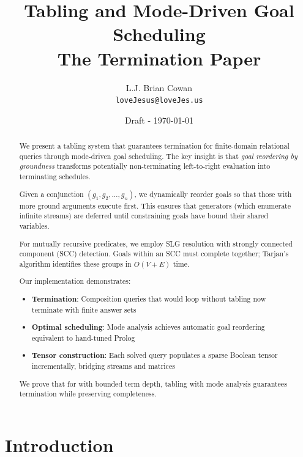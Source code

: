 \documentclass[11pt,a4paper]{article}
\title{Tabling and Mode-Driven Goal Scheduling\\
\large The Termination Paper}
\author{
  L.J. Brian Cowan \\
  \texttt{loveJesus@loveJes.us}
}
\date{Draft - \today}
\begin{document}
\maketitle

\begin{abstract}

We present a tabling system that guarantees termination for finite-domain
relational queries through mode-driven goal scheduling. The key insight is that
\emph{goal reordering by groundness} transforms potentially non-terminating
left-to-right evaluation into terminating schedules.

Given a conjunction $(g_1, g_2, \ldots, g_n)$, we dynamically reorder goals
so that those with more ground arguments execute first. This ensures that
generators (which enumerate infinite streams) are deferred until constraining
goals have bound their shared variables.

For mutually recursive predicates, we employ SLG resolution with strongly
connected component (SCC) detection. Goals within an SCC must complete
together; Tarjan's algorithm identifies these groups in $O(V+E)$ time.

Our implementation demonstrates:
\begin{itemize}
  \item \textbf{Termination}: Composition queries that would loop without
        tabling now terminate with finite answer sets
  \item \textbf{Optimal scheduling}: Mode analysis achieves automatic goal
        reordering equivalent to hand-tuned Prolog
  \item \textbf{Tensor construction}: Each solved query populates a sparse
        Boolean tensor incrementally, bridging streams and matrices
\end{itemize}

We prove that for \fdmk with bounded term depth, tabling with mode analysis
guarantees termination while preserving completeness.

\end{abstract}

\section{Introduction}
\label{sec:intro_chirho}
\end{document}

